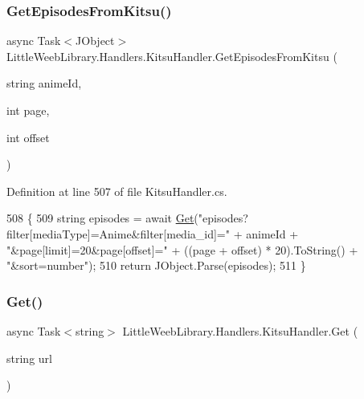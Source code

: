 \subsubsection{\texorpdfstring{Get\+Episodes\+From\+Kitsu()}{GetEpisodesFromKitsu()}}
{\footnotesize\ttfamily async Task$<$J\+Object$>$ Little\+Weeb\+Library.\+Handlers.\+Kitsu\+Handler.\+Get\+Episodes\+From\+Kitsu (\begin{DoxyParamCaption}\item[{string}]{anime\+Id,  }\item[{int}]{page,  }\item[{int}]{offset }\end{DoxyParamCaption})\hspace{0.3cm}{\ttfamily [private]}}



Definition at line 507 of file Kitsu\+Handler.\+cs.


\begin{DoxyCode}
508         \{
509             \textcolor{keywordtype}{string} episodes = await \mbox{\hyperlink{class_little_weeb_library_1_1_handlers_1_1_kitsu_handler_a8b7c629a03096c3152252f6b5cf2937f}{Get}}(\textcolor{stringliteral}{"episodes?filter[mediaType]=Anime&filter[media\_id]="} + animeId +
       \textcolor{stringliteral}{"&page[limit]=20&page[offset]="} + ((page + offset) * 20).ToString() + \textcolor{stringliteral}{"&sort=number"});
510             \textcolor{keywordflow}{return} JObject.Parse(episodes);
511         \}
\end{DoxyCode}
\mbox{\label{class_little_weeb_library_1_1_handlers_1_1_kitsu_handler_a8b7c629a03096c3152252f6b5cf2937f}} 
\subsubsection{\texorpdfstring{Get()}{Get()}}
{\footnotesize\ttfamily async Task$<$string$>$ Little\+Weeb\+Library.\+Handlers.\+Kitsu\+Handler.\+Get (\begin{DoxyParamCaption}\item[{string}]{url }\end{DoxyParamCaption})\hspace{0.3cm}{\ttfamily [private]}}



